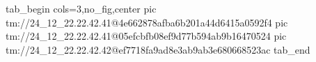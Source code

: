  
 
 
 
 

\qqSecCmtScr


\ifcmt
  tab_begin cols=3,no_fig,center
    pic tm://24_12_22.22.42.41@4e662878afba6b201a44d6415a0592f4
    pic tm://24_12_22.22.42.41@05efcbfb08ef9d77b594ab9b16470524
    pic tm://24_12_22.22.42.42@ef7718fa9ad8e3ab9ab3e680668523ac
  tab_end
\fi

